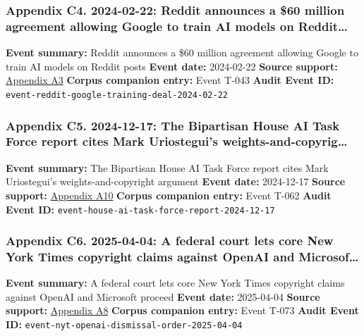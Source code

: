 \documentclass[
  american,
  11pt,
  letterpaper,
]{article}
\begin{document}
\subsubsection{Appendix C4. 2024-02-22: Reddit announces a \$60 million
agreement allowing Google to train AI models on
Reddit\ldots{}}\label{ch-04-appendix-c4-2024-02-22-reddit-announces-a-60-million-agreement-allowing-google-to-train-ai-models-on-reddit-posts}

\textbf{Event summary:} Reddit announces a \$60 million agreement
allowing Google to train AI models on Reddit posts \textbf{Event date:}
2024-02-22 \textbf{Source support:}
\hyperref[ch-04-appendix-a3-reddit-strikes-60m-deal-allowing-google-to-train-ai-models-on-its-posts-unveils-ipo-plans]{Appendix
A3} \textbf{Corpus companion entry:} Event T-043 \textbf{Audit Event
ID:} \texttt{event-reddit-google-training-deal-2024-02-22}

\subsubsection{Appendix C5. 2024-12-17: The Bipartisan House AI Task
Force report cites Mark Uriostegui's
weights-and-copyrig\ldots{}}\label{ch-04-appendix-c5-2024-12-17-the-bipartisan-house-ai-task-force-report-cites-mark-uriostegui-s-weights-and-copyright-argument}

\textbf{Event summary:} The Bipartisan House AI Task Force report cites
Mark Uriostegui's weights-and-copyright argument \textbf{Event date:}
2024-12-17 \textbf{Source support:}
\hyperref[ch-04-appendix-a10-bipartisan-house-task-force-report-on-artificial-intelligence]{Appendix
A10} \textbf{Corpus companion entry:} Event T-062 \textbf{Audit Event
ID:} \texttt{event-house-ai-task-force-report-2024-12-17}

\subsubsection{Appendix C6. 2025-04-04: A federal court lets core New
York Times copyright claims against OpenAI and
Microsof\ldots{}}\label{ch-04-appendix-c6-2025-04-04-a-federal-court-lets-core-new-york-times-copyright-claims-against-openai-and-microsoft-proceed}

\textbf{Event summary:} A federal court lets core New York Times
copyright claims against OpenAI and Microsoft proceed \textbf{Event
date:} 2025-04-04 \textbf{Source support:}
\hyperref[ch-04-appendix-a8-the-new-york-times-company-v-microsoft-corporation-et-al-opinion-on-motions-to-dismiss]{Appendix
A8} \textbf{Corpus companion entry:} Event T-073 \textbf{Audit Event
ID:} \texttt{event-nyt-openai-dismissal-order-2025-04-04}
\end{document}
